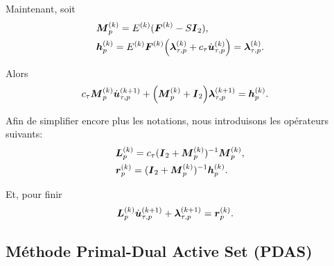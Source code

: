 \noindent Maintenant, soit
\begin{align*}
&\Mb_p^{(k)}=E^{(k)}(\bF^{(k)} - S\bI_2),\\
&\bh_p^{(k)}=E^{(k)}\bF^{(k)} \Big(\blambda_{\tau, p}^{(k)}+ c_{\tau}\dot\bu_{\tau, p}^{(k)}\Big)=\blambda_{\tau, p}^{(k)}.
\end{align*}

\noindent Alors
\begin{align*}
&c_{\tau}\Mb_p^{(k)}\dot\bu_{\tau, p}^{(k+1)}+ \Big(\Mb_p^{(k)} +\bI_2\Big) \blambda_{\tau, p}^{(k+1)}= \bh_p^{(k)}.
\end{align*}

\noindent Afin de simplifier encore plus les notations, nous introduisons les opérateurs suivants:
\begin{align*}
&\bL_p^{(k)}=c_{\tau}(\bI_2+ \Mb_p^{(k)})^{-1}\Mb_p^{(k)},\\
&\br_p^{(k)}=(\bI_2+ \Mb_p^{(k)})^{-1}\bh_p^{(k)}.
\end{align*}

\noindent Et, pour finir
\begin{align}\label{fullfinal}
&\bL_p^{(k)}\dot\bu_{\tau, p}^{(k+1)}+ \blambda_{\tau, p}^{(k+1)}= \br_p^{(k)}.
\end{align}

\subsection{Méthode Primal-Dual Active Set (PDAS)}

